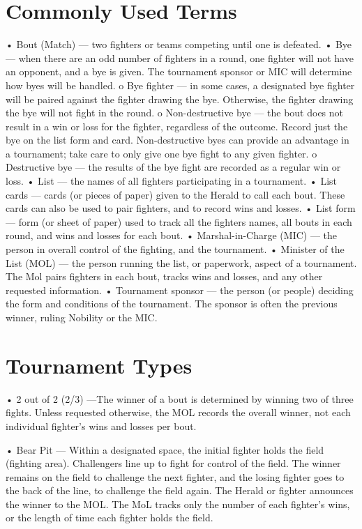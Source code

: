 \documentclass{article}
\begin{document}
\section{Commonly Used Terms}

• Bout (Match) --- two fighters or teams competing until one is defeated.
• Bye --- when there are an odd number of fighters in a round, one fighter will not have an opponent, and
a bye is given. The tournament sponsor or MIC will determine how byes will be handled.
o Bye fighter --- in some cases, a designated bye fighter will be paired against the fighter drawing
the bye. Otherwise, the fighter drawing the bye will not fight in the round.
o Non-destructive bye --- the bout does not result in a win or loss for the fighter, regardless of the
outcome. Record just the bye on the list form and card. Non-destructive byes can provide an
advantage in a tournament; take care to only give one bye fight to any given fighter.
o Destructive bye --- the results of the bye fight are recorded as a regular win or loss.
• List --- the names of all fighters participating in a tournament.
• List cards --- cards (or pieces of paper) given to the Herald to call each bout. These cards can also be
used to pair fighters, and to record wins and losses.
• List form --- form (or sheet of paper) used to track all the fighters names, all bouts in each round, and
wins and losses for each bout.
• Marshal-in-Charge (MIC) --- the person in overall control of the fighting, and the tournament.
• Minister of the List (MOL) --- the person running the list, or paperwork, aspect of a tournament. The
Mol pairs fighters in each bout, tracks wins and losses, and any other requested information.
• Tournament sponsor --- the person (or people) deciding the form and conditions of the tournament.
The sponsor is often the previous winner, ruling Nobility or the MIC.

\section{Tournament Types}
• 2 out of 2 (2/3) ---The winner of a bout is determined by winning two of three fights. Unless requested
otherwise, the MOL records the overall winner, not each individual fighter’s wins and losses per bout.

• Bear Pit --- Within a designated space, the initial fighter holds the field (fighting area). Challengers
line up to fight for control of the field. The winner remains on the field to challenge the next fighter,
and the losing fighter goes to the back of the line, to challenge the field again. The Herald or fighter
announces the winner to the MOL. The MoL tracks only the number of each fighter’s wins, or the
length of time each fighter holds the field.
\end{document}
